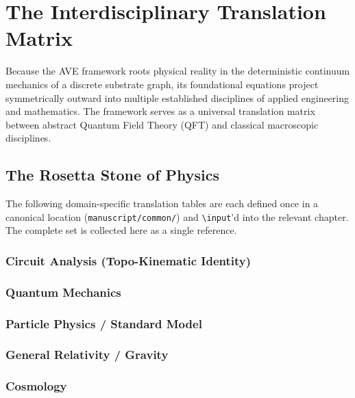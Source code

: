 \appendix

\chapter{The Interdisciplinary Translation Matrix}
\label{app:translation_matrix}

Because the AVE framework roots physical reality in the deterministic continuum mechanics of a discrete substrate graph, its foundational equations project symmetrically outward into multiple established disciplines of applied engineering and mathematics. The framework serves as a universal translation matrix between abstract Quantum Field Theory (QFT) and classical macroscopic disciplines.

\section{The Rosetta Stone of Physics}

The following domain-specific translation tables are each defined once in a canonical location (\texttt{manuscript/common/}) and \texttt{\textbackslash input}'d into the relevant chapter.  The complete set is collected here as a single reference.

\subsection{Circuit Analysis (Topo-Kinematic Identity)}


\subsection{Quantum Mechanics}


\subsection{Particle Physics / Standard Model}


\subsection{General Relativity / Gravity}


\subsection{Cosmology}


